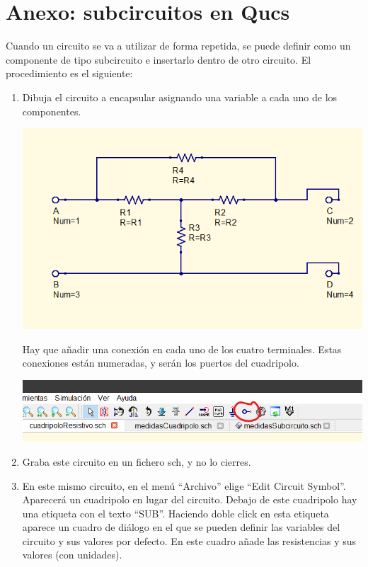 \documentclass[a4paper,10pt]{article} %
\begin{document}
\clearpage

\section*{Anexo: subcircuitos en Qucs}

Cuando un circuito se va a utilizar de forma repetida, se puede definir como un componente de tipo subcircuito e insertarlo dentro de otro circuito. El procedimiento es el siguiente:

\begin{enumerate}

\item Dibuja el circuito a encapsular asignando una variable a cada uno de los componentes. 

  \begin{center}
    \includegraphics[width=.7\linewidth]{../figs/CircuitoResistivo_Qucs.png}
  \end{center}

  Hay que añadir una conexión en cada uno de los cuatro terminales. Estas conexiones están numeradas, y serán los puertos del cuadripolo.

  \begin{center}
    \includegraphics[width=\linewidth]{../figs/InsertarConexion_qucs.png}
  \end{center}

\item Graba este circuito en un fichero sch, y no lo cierres.
\item En este mismo circuito, en el menú ``Archivo'' elige ``Edit Circuit Symbol''. Aparecerá un cuadripolo en lugar del circuito. Debajo de este cuadripolo hay una etiqueta con el texto ``SUB''. Haciendo doble click en esta etiqueta aparece un cuadro de diálogo en el que se pueden definir las variables del circuito y sus valores por defecto. En este cuadro añade las resistencias y sus valores (con unidades).


\end{enumerate}
\end{document}
